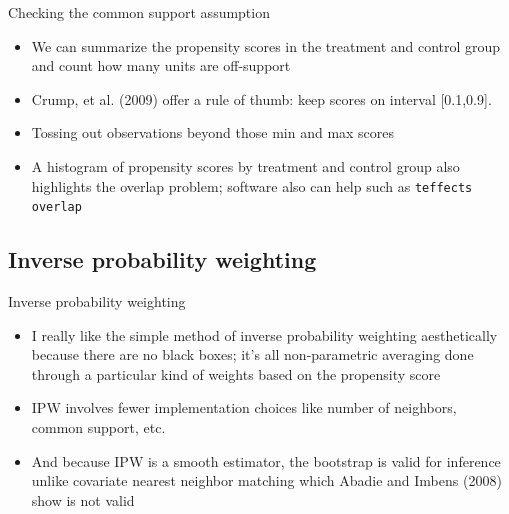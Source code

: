 \documentclass{beamer}
\begin{document}
\begin{frame}{Checking the common support assumption}
	
	\begin{itemize}
	\item We can summarize the propensity scores in the treatment and control group and count how many units are off-support
	\item Crump, et al. (2009) offer a rule of thumb: keep scores on interval [0.1,0.9]. 
	\item Tossing out observations beyond those min and max scores
	\item A histogram of propensity scores by treatment and control group also highlights the overlap problem; software also can help such as \texttt{teffects overlap}
	\end{itemize}
	
\end{frame}



\subsection{Inverse probability weighting}

\begin{frame}{Inverse probability weighting}

\begin{itemize}
	\item I really like the simple method of inverse probability weighting aesthetically because there are no black boxes; it's all non-parametric averaging done through a particular kind of weights based on the propensity score
	\item IPW involves fewer implementation choices like number of neighbors, common support, etc.
	\item And because IPW is a smooth estimator, the bootstrap is valid for inference unlike covariate nearest neighbor matching which Abadie and Imbens (2008) show is not valid
\end{itemize}

\end{frame}
\end{document}
